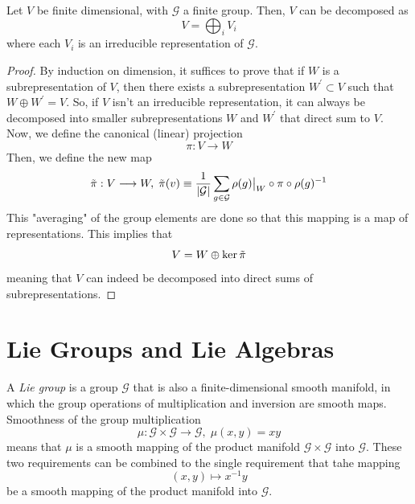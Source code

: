 \documentclass{article}
\begin{document}
  \begin{theorem}
  Let $V$ be finite dimensional, with $\mathcal{G}$ a finite group. Then, $V$ can be decomposed as 
  \[V = \bigoplus_{i} V_i\]
  where each $V_i$ is an irreducible representation of $\mathcal{G}$. 
  \end{theorem}
  \begin{proof}
  By induction on dimension, it suffices to prove that if $W$ is a subrepresentation of $V$, then there exists a subrepresentation $W^\prime \subset V$ such that $W \oplus W^\prime = V$. So, if $V$ isn't an irreducible representation, it can always be decomposed into smaller subrepresentations $W$ and $W^\prime$ that direct sum to $V$. Now, we define the canonical (linear) projection 
  \[\pi: V \longrightarrow W\]
  Then, we define the new map 
  \[\Tilde{\pi}: V \longrightarrow W, \; \Tilde{\pi}(v) \equiv \frac{1}{|\mathcal{G}|} \sum_{g \in \mathcal{G}} \rho(g)\big|_W \circ \pi \circ \rho(g)^{-1}\]
  This "averaging" of the group elements are done so that this mapping is a map of representations. This implies that 
  \[V = W \oplus \ker{\Tilde{\pi}}\]
  meaning that $V$ can indeed be decomposed into direct sums of subrepresentations. 
  \end{proof}

\section{Lie Groups and Lie Algebras}

    \begin{definition}
    A \textit{Lie group} is a group $\mathcal{G}$ that is also a finite-dimensional smooth manifold, in which the group operations of multiplication and inversion are smooth maps. Smoothness of the group multiplication
    \[\mu: \mathcal{G} \times \mathcal{G} \longrightarrow \mathcal{G}, \; \mu(x, y) = x y\]
    means that $\mu$ is a smooth mapping of the product manifold $\mathcal{G} \times \mathcal{G}$ into $\mathcal{G}$. These two requirements can be combined to the single requirement that tahe mapping 
    \[(x, y) \mapsto x^{-1} y\]
    be a smooth mapping of the product manifold into $\mathcal{G}$. 
    \end{definition}
\end{document}
